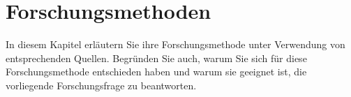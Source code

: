\section{Forschungsmethoden}
\label{cha:method}
In diesem Kapitel erläutern Sie ihre Forschungsmethode unter Verwendung von entsprechenden Quellen. Begründen Sie auch, warum Sie sich für diese Forschungsmethode entschieden haben und warum sie geeignet ist, die vorliegende Forschungsfrage zu beantworten.